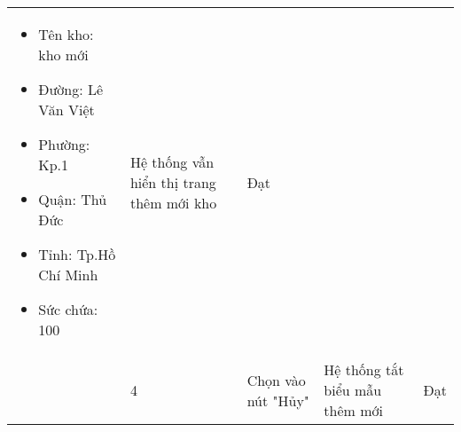 {\begin{longtable}{| p{2.5cm}| p{1cm}| p{5.5cm}| p{4.5cm} | p{1.5cm} |}
\begin{itemize}
            \item Tên kho: kho mới
            \item Đường: Lê Văn Việt
            \item Phường: Kp.1
            \item Quận: Thủ Đức 
            \item Tỉnh: Tp.Hồ Chí Minh
            \item Sức chứa: 100
        \end{itemize} & Hệ thống vẫn hiển thị trang thêm mới kho & Đạt \\
        \cline{2-5}
         & 4 & Chọn vào nút "Hủy" & Hệ thống tắt biểu mẫu thêm mới & Đạt \\
        \hline
    \end{longtable} 
}


